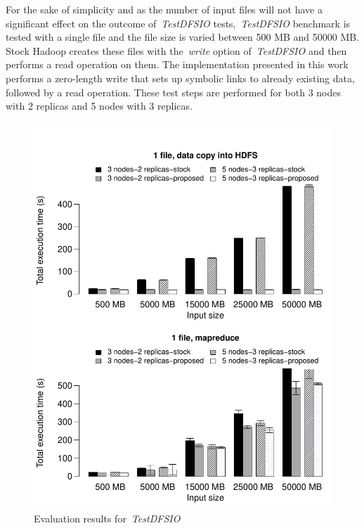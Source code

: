 \documentclass[preprint,12pt]{elsarticle}
\begin{document}
For the sake of simplicity and as the number of input files will not have a significant effect
on the outcome of~\textit{TestDFSIO} tests,~\textit{TestDFSIO} benchmark is tested with a single
file and the file size is varied between 500 MB and 50000 MB. Stock Hadoop creates these files with
the~\textit{write} option of~\textit{TestDFSIO} and then performs a read operation on them. The
implementation presented in this work performs a zero-length write that sets up symbolic links to
already existing data, followed by a read operation. These test steps are performed for both
3 nodes with 2 replicas and 5 nodes with 3 replicas.

\begin{figure}[!htbp]
\centering
\includegraphics[width=\columnwidth, keepaspectratio]{result3.pdf}
\caption{Evaluation results for~\textit{TestDFSIO}}
\label{testdfsiores}
\end{figure}
\end{document}
